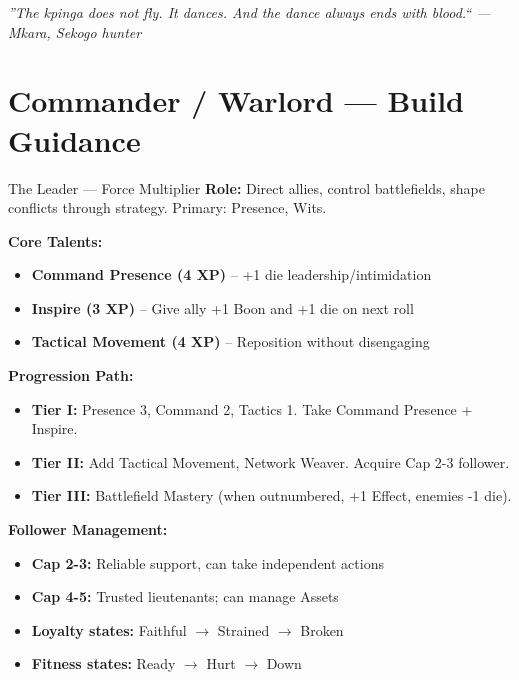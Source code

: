 \documentclass[10pt]{article}
\begin{document}
\vspace{0.5em}
\begin{center}
    {\small\sffamily\itshape ''The kpinga does not fly. It dances. And the dance always ends with blood.`` --- Mkara, Sekogo hunter}
\end{center}

\newpage


\section*{Commander / Warlord --- Build Guidance}

\begin{tipbox}{The Leader --- Force Multiplier}
    \textbf{Role:} Direct allies, control battlefields, shape conflicts through strategy. Primary: Presence, Wits.
    
    \textbf{Core Talents:}
    \begin{itemize}
        \item \textbf{Command Presence (4 XP)} -- +1 die leadership/intimidation
        \item \textbf{Inspire (3 XP)} -- Give ally +1 Boon and +1 die on next roll
        \item \textbf{Tactical Movement (4 XP)} -- Reposition without disengaging
    \end{itemize}
    
    \textbf{Progression Path:}
    \begin{itemize}
        \item \textbf{Tier I:} Presence 3, Command 2, Tactics 1. Take Command Presence + Inspire.
        \item \textbf{Tier II:} Add Tactical Movement, Network Weaver. Acquire Cap 2-3 follower.
        \item \textbf{Tier III:} Battlefield Mastery (when outnumbered, +1 Effect, enemies -1 die).
    \end{itemize}
    
    \textbf{Follower Management:}
    \begin{itemize}
        \item \textbf{Cap 2-3:} Reliable support, can take independent actions
        \item \textbf{Cap 4-5:} Trusted lieutenants; can manage Assets
        \item \textbf{Loyalty states:} Faithful $\rightarrow$ Strained $\rightarrow$ Broken
        \item \textbf{Fitness states:} Ready $\rightarrow$ Hurt $\rightarrow$ Down
    \end{itemize}
\end{tipbox}
\end{document}
